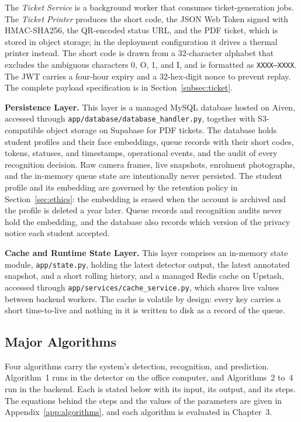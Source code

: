 \documentclass{research}
\begin{document}
The \emph{Ticket Service} is a background worker that consumes
ticket-generation jobs. The \emph{Ticket Printer} produces the short
code, the JSON Web Token signed with HMAC-SHA256, the QR-encoded status
URL, and the PDF ticket, which is stored in object storage; in the
deployment configuration it drives a thermal printer instead. The short
code is drawn from a 32-character alphabet that excludes the ambiguous
characters 0, O, 1, and I, and is formatted as \texttt{XXXX--XXXX}. The
JWT carries a four-hour expiry and a 32-hex-digit nonce to prevent
replay. The complete payload specification is in
Section~\ref{subsec:ticket}.

\textbf{Persistence Layer.} This layer is a managed MySQL database hosted
on Aiven, accessed through \texttt{app/database/database\_handler.py},
together with S3-compatible object storage on Supabase for PDF tickets.
The database holds student profiles and their face embeddings, queue
records with their short codes, tokens, statuses, and timestamps,
operational events, and the audit of every recognition decision. Raw
camera frames, live snapshots, enrolment photographs, and the in-memory
queue state are intentionally never persisted. The student profile and
its embedding are governed by the retention policy in
Section~\ref{sec:ethics}: the embedding is erased when the account is
archived and the profile is deleted a year later. Queue records and
recognition audits never hold the embedding, and the database also
records which version of the privacy notice each student accepted.

\textbf{Cache and Runtime State Layer.} This layer comprises an in-memory
state module, \texttt{app/state.py}, holding the latest detector output,
the latest annotated snapshot, and a short rolling history, and a managed
Redis cache on Upstash, accessed through
\texttt{app/services/cache\_service.py}, which shares live values
between backend workers. The cache is volatile by design: every key
carries a short time-to-live and nothing in it is written to disk as a
record of the queue.

\subsection{Major Algorithms}
\label{subsec:major-algorithms}
\label{cr:algorithms}

Four algorithms carry the system's detection, recognition, and
prediction. Algorithm~1 runs in the detector on the office computer, and
Algorithms~2 to~4 run in the backend. Each is stated below with its
input, its output, and its steps. The equations behind the steps and the
values of the parameters are given in Appendix~\ref{app:algorithms}, and
each algorithm is evaluated in Chapter~3.
\end{document}
